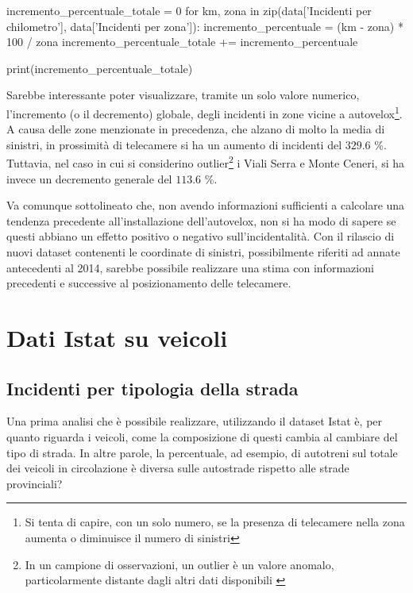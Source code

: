 \documentclass[a4paper,12pt]{report}
\begin{document}
\begin{code}
incremento_percentuale_totale = 0
for km, zona in zip(data['Incidenti per chilometro'], data['Incidenti per zona']): 
    incremento_percentuale = (km - zona) * 100 / zona
    incremento_percentuale_totale += incremento_percentuale

print(incremento_percentuale_totale)
\end{code}

Sarebbe interessante poter visualizzare, tramite un solo valore numerico, 
l'incremento (o il decremento) globale, degli incidenti in zone vicine a 
autovelox\footnote{Si tenta di capire, con un solo numero, se la presenza di 
telecamere nella zona aumenta o diminuisce il numero di sinistri}. 
A causa delle zone menzionate in precedenza, che alzano di molto la media di sinistri, 
in prossimità di telecamere si ha un aumento di 
incidenti del $329.6$ \%. 
Tuttavia, nel caso in cui si considerino 
outlier\footnote{In un campione di osservazioni, un outlier è un valore anomalo, 
particolarmente distante dagli altri dati disponibili \cite{PROB_E_STATISTICA:1}} 
i Viali Serra e Monte Ceneri, si ha invece un decremento generale del $113.6$ \%. 

Va comunque sottolineato che, non avendo informazioni sufficienti a calcolare una tendenza 
precedente all'installazione dell'autovelox, non si ha modo di sapere se questi abbiano un 
effetto positivo o negativo sull'incidentalità. 
Con il rilascio di nuovi dataset contenenti le coordinate di sinistri, 
possibilmente riferiti ad annate antecedenti al 2014, sarebbe possibile realizzare 
una stima con informazioni precedenti e 
successive al posizionamento delle telecamere. 


\section{Dati Istat su veicoli}

\subsection{Incidenti per tipologia della strada}

Una prima analisi che è possibile realizzare, utilizzando il dataset Istat è, 
per quanto riguarda i veicoli, 
come la composizione di questi cambia al cambiare del tipo di strada. 
In altre parole, la percentuale, ad esempio, di autotreni sul totale dei veicoli 
in circolazione è diversa sulle autostrade rispetto alle strade provinciali?
\end{document}
